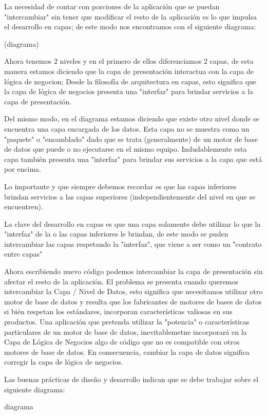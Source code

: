 La necesidad de contar con porciones de la aplicación que se puedan "intercambiar" sin tener que modificar el resto de la aplicación es lo 
que impulsa el desarrollo en capas; de este modo nos encontramos con el siguiente diagrama:

(diagrama)

Ahora tenemos 2 niveles y en el primero de ellos diferenciamos 2 capas, de esta manera estamos diciendo que la capa de presentación 
interactua con la capa de lógica de negocion; Desde la filosofía de arquitectura en capas, esto significa que la capa de lógica de negocios 
presenta una "interfaz" para brindar servicios a la capa de presentación.

Del mismo modo, en el diagrama estamos diciendo que existe otro nivel donde se encuentra una capa encargada de los datos. Esta capa no se 
muestra como un "paquete" o "ensamblado" dado que se trata (generalmente) de un motor de base de datos que puede o no ejecutarse en el mismo 
equipo. Indudablemente esta capa también presenta una "interfaz" para brindar sus servicios a la capa que está por encima.

Lo importante y que siempre debemos recordar es que las capas inferiores brindan servicios a las capas superiores (independientemente 
del nivel en que se encuentren).

La clave del desarrollo en capas es que una capa solamente debe utilizar lo que la "interfaz" de la o las capas inferiores le brindan, 
de este modo se puden intercambiar las capas respetando la "interfaz", que viene a ser como un "contrato entre capas"

Ahora escribiendo nuevo código podemos intercambiar la capa de presentación sin afectar el resto de la aplicación. El problema 
se presenta cuando queremos intercambiar la Capa / Nivel de Datos, esto significa que necesitamos utilizar otro motor de base de datos y 
resulta que los fabricantes de motores de bases de datos si bién respetan los estándares, incorporan características valiosas en 
sus productos. Una aplicación que pretenda utilizar la "potencia" o características particulares de un motor de base de datos, 
inevitablemetne incorporará en la Capa de Lógica de Negocios algo de código que no es compatible con otros motores de base de datos. 
En consecuencia, cambiar la capa de datos significa corregir la capa de lógica de negocios.

Las buenas prácticas de diseño y desarrollo indican que se debe trabajar sobre el siguiente diagrama:

diagrama


